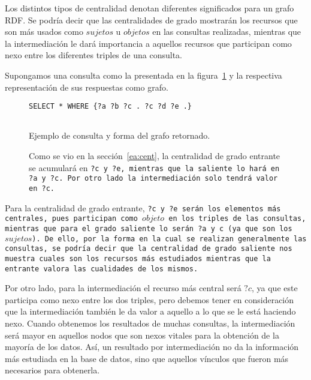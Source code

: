 Los distintos tipos de centralidad denotan diferentes significados para un grafo
RDF.
Se podría decir que las centralidades de grado mostrarán los recursos que son
más usados como $sujetos$ u $objetos$ en las consultas realizadas, mientras que
la intermediación le dará importancia a aquellos recursos que participan como
nexo entre los diferentes triples de una consulta.

Supongamos una consulta como la presentada en la figura~\ref{fig:excen} y la
respectiva representación de sus respuestas como grafo.

\begin{figure}[h!]
  \centering
  \tt{SELECT * WHERE \{?a ?b ?c . ?c ?d ?e .\}}
  \\\tt{~}\\
  \caption{Ejemplo de consulta y forma del grafo retornado.}
  \label{fig:excen}
  \vspace{-.2cm}
  \caption*{\small
    Como se vio en la sección~\ref{ea:cent}, la centralidad de grado entrante se
    acumulará en \tt{?c} y \tt{?e}, mientras que la saliente lo hará en \tt{?a}
    y \tt{?c}. Por otro lado la intermediación solo tendrá valor en \tt{?c}.
  }
\end{figure}

Para la centralidad de grado entrante, \tt{?c} y \tt{?e} serán los elementos más
centrales, pues participan como $objeto$ en los triples de las consultas,
mientras que para el grado saliente lo serán \tt{?a} y \tt{c} (ya que son
los $sujetos$).
De ello, por la forma en la cual se realizan generalmente las consultas, se
podría decir que la centralidad de grado saliente nos muestra cuales son los
recursos más estudiados mientras que la entrante valora las cualidades de
los mismos.

Por otro lado, para la intermediación el recurso más central será $?c$, ya que
este participa como nexo entre los dos triples, pero debemos tener en
consideración que la intermediación también le da valor a aquello a lo que se le
está haciendo nexo.
Cuando obtenemos los resultados de muchas consultas, la intermediación será
mayor en aquellos nodos que son nexos vitales para la obtención de la mayoría de
los datos.
Así, un resultado por intermediación no da la información más estudiada en la
base de datos, sino que aquellos vínculos que fueron más necesarios para
obtenerla.

